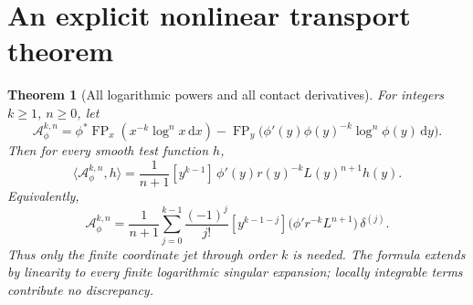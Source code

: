 \documentclass[11pt]{article}
\newtheorem{theorem}{Theorem}[section]
\theoremstyle{definition}\newtheorem{definition}[theorem]{Definition}
\theoremstyle{remark}\newtheorem{remark}[theorem]{Remark}
\DeclareMathOperator{\FP}{FP}
\newcommand{\dd}{\,\mathrm d}
\newcommand{\Ac}{\mathcal A}
\begin{document}
\section{An explicit nonlinear transport theorem}
\label{sec:transport}
\begin{theorem}[All logarithmic powers and all contact derivatives]\label{thm:universal}
For integers $k\ge1$, $n\ge0$, let
\begin{equation}
\Ac_\phi^{k,n}
=\phi^*\FP_x(x^{-k}\log^n x\dd x)
-\FP_y\bigl(\phi'(y)\phi(y)^{-k}\log^n\phi(y)\dd y\bigr).
\end{equation}
Then for every smooth test function $h$,
\begin{equation}\label{eq:universal-action}
\boxed{\displaystyle
\langle\Ac_\phi^{k,n},h\rangle
=\frac1{n+1}[y^{k-1}]\,
\phi'(y)r(y)^{-k}L(y)^{n+1}h(y).}
\end{equation}
Equivalently,
\begin{equation}\label{eq:universal-deltas}
\Ac_\phi^{k,n}
=\frac1{n+1}\sum_{j=0}^{k-1}\frac{(-1)^j}{j!}
[y^{k-1-j}]\bigl(\phi'r^{-k}L^{n+1}\bigr)\,\delta^{(j)}.
\end{equation}
Thus only the finite coordinate jet through order $k$ is needed. The formula extends by linearity to every finite logarithmic singular expansion; locally integrable terms contribute no discrepancy.
\end{theorem}
\end{document}
